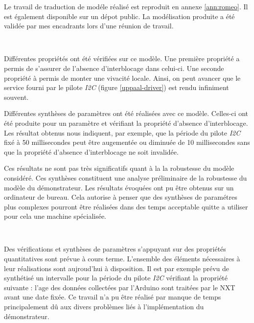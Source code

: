     Le travail de traduction de modéle réalisé est reproduit en annexe
    \ref{ann:romeo}. Il est également disponible sur un dépot
    public\footnotemark. La modélisation produite a été
    validée par mes encadrants lors d'une réunion de travail.
    
    ~
    
    Différentes propriétés ont été vérifiées sur ce modèle. Une première
    propriété a permis de s'assurer de l'absence d'interblocage dans celui-ci.
    Une seconde propriété à permis de monter une vivacité locale. Ainsi, on peut
    avancer que le service fourni par le pilote {\it I2C} (figure
    \ref{uppaal-driver}) est rendu infiniment souvent.
    
    Différentes synthèses de paramètres ont été réalisées avec ce modèle.
    Celles-ci ont été produite pour un paramètre et vérifiant la propriété
    d'absence d'interblocage. Les résultat obtenus nous indiquent, par exemple,
    que la période du pilote {\it I2C} fixé à 50 millisecondes peut être
    augementée ou diminuée de 10 millisecondes sans que la propriété d'absence
    d'interblocage ne soit invalidée.

    Ces résultats ne sont pas très significatifs quant à la la robustesse du
    modèle considéré. Ces synthèses constituent une analyse préliminaire de la
    robustesse du modèle du démonstrateur. Les résultats évoquées ont pu
    être obtenus sur un ordinateur de bureau. Cela autorise à penser que des
    synthèses de paramétres plus complexes pourront être réalisées 
    dans des temps acceptable quitte a utiliser pour cela une machine spécialisée.
         
    ~
    
    Des vérifications et synthèses de paramètres s'appuyant sur des propriétés
    quantitatives sont prévue à cours terme. L'ensemble des éléments nécessaires à leur
    réalisations sont aujroud'hui à disposition. Il est par exemple prévu de synthétisé un
    intervalle pour la période du pilote {\it I2C} vérifiant la propriété
    suivante : l'age des données collectées par l'Arduino sont traitées par le
    NXT avant une date fixée. Ce travail n'a pu être réalisé par manque de temps
    principalement dû aux divers problèmes liés à l'implémentation du
    démonstrateur.
    
    ~
    
